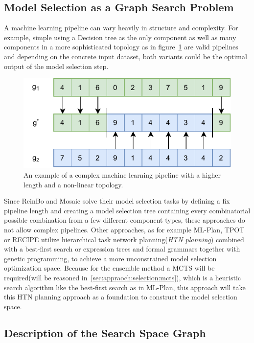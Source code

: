 \subsection{Model Selection as a Graph Search Problem}
\label{sec:appraoch:selection:search}
A machine learning pipeline can vary heavily in structure and complexity.
For example, simple using a Decision tree as the only component as well as many components in a more sophisticated topology as in figure~\ref{fig:appraoch:complex-pipeline} are valid pipelines and depending on the concrete input dataset, both variants could be the optimal output of the model selection step.
\begin{figure}[ht!]
    \centering
    \includegraphics[width=\textwidth]{gfx/Figures/Theory/Crossover.pdf}
    \caption{An example of a complex machine learning pipeline with a higher length and a non-linear topology.}
    \label{fig:appraoch:complex-pipeline}
\end{figure}
Since ReinBo and Mosaic solve their model selection tasks by defining a fix pipeline length and creating a model selection tree containing every combinatorial possible combination from a few different component types, these approaches do not allow complex pipelines.\newline
Other approaches, as for example ML-Plan, TPOT or RECIPE utilize hierarchical task network planning(\textit{HTN planning}) combined with a best-first search or expression trees and formal grammars together with genetic programming, to achieve a more unconstrained model selection optimization space.
Because for the ensemble method a MCTS will be required(will be reasoned in~\ref{sec:appraoch:selection:mcts}), which is a heuristic search algorithm like the best-first search as in ML-Plan, this approach will take this HTN planning approach as a foundation to construct the model selection space.

\subsection{Description of the Search Space Graph}
\label{sec:appraoch:selection:graph}

